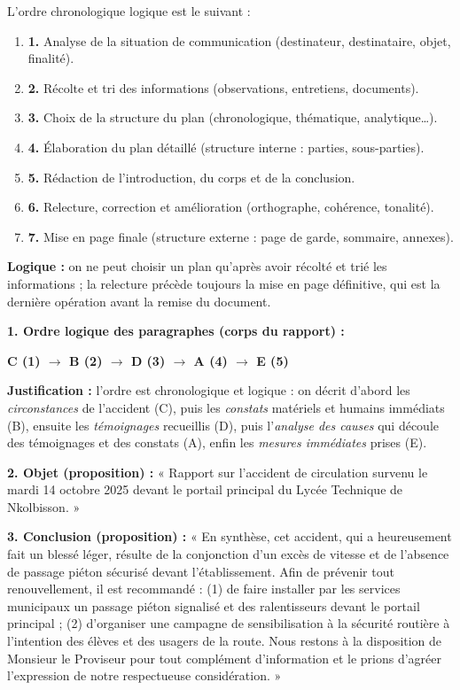 \documentclass[11pt]{article}
\newcommand{\cle}[1]{{\popxbold\color{popdark}#1}}
\begin{document}
\begin{corrige}
L'ordre chronologique logique est le suivant :
\begin{enumerate}
    \item \textbf{1.} Analyse de la situation de communication (destinateur, destinataire, objet, finalité).
    \item \textbf{2.} Récolte et tri des informations (observations, entretiens, documents).
    \item \textbf{3.} Choix de la structure du plan (chronologique, thématique, analytique\ldots).
    \item \textbf{4.} Élaboration du plan détaillé (structure interne : parties, sous-parties).
    \item \textbf{5.} Rédaction de l'introduction, du corps et de la conclusion.
    \item \textbf{6.} Relecture, correction et amélioration (orthographe, cohérence, tonalité).
    \item \textbf{7.} Mise en page finale (structure externe : page de garde, sommaire, annexes).
\end{enumerate}
\textbf{Logique :} on ne peut choisir un plan qu'après avoir récolté et trié les informations ; la relecture précède toujours la mise en page définitive, qui est la dernière opération avant la remise du document.
\end{corrige}

\begin{corrige}
\textbf{1. Ordre logique des paragraphes (corps du rapport) :}
\begin{center}
\textbf{C (1) $\rightarrow$ B (2) $\rightarrow$ D (3) $\rightarrow$ A (4) $\rightarrow$ E (5)}
\end{center}
\textbf{Justification :} l'ordre est \cle{chronologique et logique} : on décrit d'abord les \emph{circonstances} de l'accident (C), puis les \emph{constats} matériels et humains immédiats (B), ensuite les \emph{témoignages} recueillis (D), puis l'\emph{analyse des causes} qui découle des témoignages et des constats (A), enfin les \emph{mesures immédiates} prises (E).

\textbf{2. Objet (proposition) :} « Rapport sur l'accident de circulation survenu le mardi 14 octobre 2025 devant le portail principal du Lycée Technique de Nkolbisson. »

\textbf{3. Conclusion (proposition) :}
« En synthèse, cet accident, qui a heureusement fait un blessé léger, résulte de la conjonction d'un excès de vitesse et de l'absence de passage piéton sécurisé devant l'établissement. Afin de prévenir tout renouvellement, il est recommandé : (1) de faire installer par les services municipaux un passage piéton signalisé et des ralentisseurs devant le portail principal ; (2) d'organiser une campagne de sensibilisation à la sécurité routière à l'intention des élèves et des usagers de la route. Nous restons à la disposition de Monsieur le Proviseur pour tout complément d'information et le prions d'agréer l'expression de notre respectueuse considération. »
\end{corrige}
\end{document}
